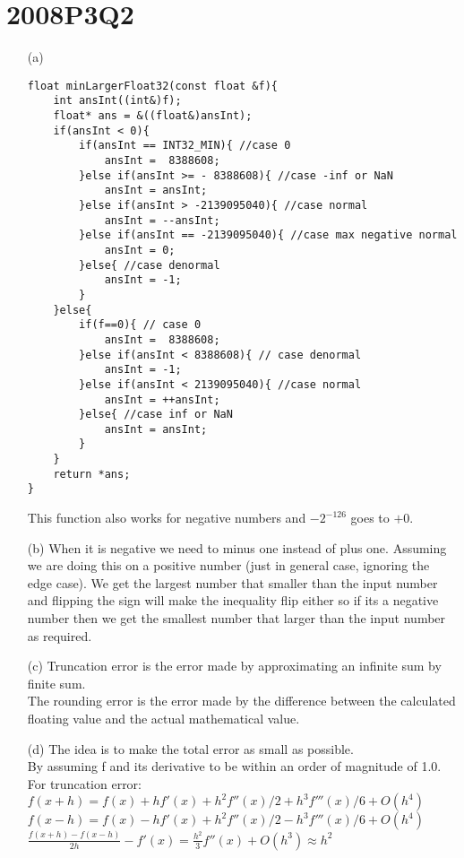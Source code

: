 \documentclass[10pt,twoside,a4paper]{article}
\begin{document}
\section*{2008P3Q2}
\begin{itemize}

\item[(a)]
\begin{lstlisting}
float minLargerFloat32(const float &f){
    int ansInt((int&)f);
    float* ans = &((float&)ansInt);
    if(ansInt < 0){
        if(ansInt == INT32_MIN){ //case 0
            ansInt =  8388608;
        }else if(ansInt >= - 8388608){ //case -inf or NaN
            ansInt = ansInt;
        }else if(ansInt > -2139095040){ //case normal
            ansInt = --ansInt;
        }else if(ansInt == -2139095040){ //case max negative normal
            ansInt = 0;
        }else{ //case denormal
            ansInt = -1;
        }
    }else{
        if(f==0){ // case 0
            ansInt =  8388608;
        }else if(ansInt < 8388608){ // case denormal
            ansInt = -1;
        }else if(ansInt < 2139095040){ //case normal
            ansInt = ++ansInt;
        }else{ //case inf or NaN
            ansInt = ansInt;
        }
    }
    return *ans;
}
\end{lstlisting}
This function also works for negative numbers and $-2^{-126}$ goes to $+0$.
\item[(b)]
When it is negative we need to minus one instead of plus one. Assuming we are doing this on a positive number (just in general case, ignoring the edge case). We get the largest number that smaller than the input number and flipping the sign will make the inequality flip either so if its a negative number then we get the smallest number that larger than the input number as required.
\item[(c)]
Truncation error is the error made by approximating an infinite sum by finite sum.
\\The rounding error is the error made by the difference between the calculated floating value and the actual mathematical value. 
\item[(d)]
The idea is to make the total error as small as possible.
\\By assuming f and its derivative to be within an order of magnitude of 1.0.
\\For truncation error:
\\$f(x+h)=f(x)+hf'(x)+h^2f''(x)/2+h^3f'''(x)/6+O(h^4)$
\\$f(x-h)=f(x)-hf'(x)+h^2f''(x)/2-h^3f'''(x)/6+O(h^4)$
\\$\frac{f(x+h)-f(x-h)}{2h}-f'(x)=\frac{h^2}{3}f''(x)+O(h^3)\approx h^2$

\end{itemize}
\end{document}
